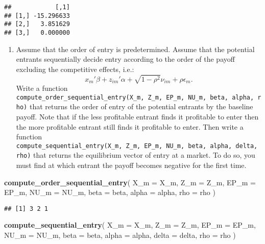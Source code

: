 \documentclass[
]{book}
\newenvironment{Shaded}{\begin{snugshade}}{\end{snugshade}}
\newcommand{\AttributeTok}[1]{\textcolor[rgb]{0.13,0.29,0.53}{#1}}
\newcommand{\FunctionTok}[1]{\textcolor[rgb]{0.13,0.29,0.53}{\textbf{#1}}}
\newcommand{\NormalTok}[1]{#1}
\providecommand{\tightlist}{%
  \setlength{\itemsep}{0pt}\setlength{\parskip}{0pt}}
\begin{document}
\begin{verbatim}
##            [,1]
## [1,] -15.296633
## [2,]   3.851629
## [3,]   0.000000
\end{verbatim}

\begin{enumerate}
\def\labelenumi{\arabic{enumi}.}
\setcounter{enumi}{4}
\tightlist
\item
  Assume that the order of entry is predetermined. Assume that the potential entrants sequentially decide entry according to the order of the payoff excluding the competitive effects, i.e.:
  \[
  x_m'\beta + z_{im}'\alpha + \sqrt{1 - \rho^2} \nu_{im} + \rho \epsilon_{m}.
  \]
  Write a function \texttt{compute\_order\_sequential\_entry(X\_m,\ Z\_m,\ EP\_m,\ NU\_m,\ beta,\ alpha,\ rho)} that returns the order of entry of the potential entrants by the baseline payoff. Note that if the less profitable entrant finds it profitable to enter then the more profitable entrant still finds it profitable to enter. Then write a function \texttt{compute\_sequential\_entry(X\_m,\ Z\_m,\ EP\_m,\ NU\_m,\ beta,\ alpha,\ delta,\ rho)} that returns the equilibrium vector of entry at a market. To do so, you must find at which entrant the payoff becomes negative for the first time.
\end{enumerate}

\begin{Shaded}
\begin{Highlighting}[]
\FunctionTok{compute\_order\_sequential\_entry}\NormalTok{(}
    \AttributeTok{X\_m =}\NormalTok{ X\_m,}
    \AttributeTok{Z\_m =}\NormalTok{ Z\_m, }
    \AttributeTok{EP\_m =}\NormalTok{ EP\_m, }
    \AttributeTok{NU\_m =}\NormalTok{ NU\_m, }
    \AttributeTok{beta =}\NormalTok{ beta, }
    \AttributeTok{alpha =}\NormalTok{ alpha, }
    \AttributeTok{rho =}\NormalTok{ rho}
\NormalTok{    )}
\end{Highlighting}
\end{Shaded}

\begin{verbatim}
## [1] 3 2 1
\end{verbatim}

\begin{Shaded}
\begin{Highlighting}[]
\FunctionTok{compute\_sequential\_entry}\NormalTok{(}
  \AttributeTok{X\_m =}\NormalTok{ X\_m, }
  \AttributeTok{Z\_m =}\NormalTok{ Z\_m, }
  \AttributeTok{EP\_m =}\NormalTok{ EP\_m, }
  \AttributeTok{NU\_m =}\NormalTok{ NU\_m, }
  \AttributeTok{beta =}\NormalTok{ beta, }
  \AttributeTok{alpha =}\NormalTok{ alpha, }
  \AttributeTok{delta =}\NormalTok{ delta, }
  \AttributeTok{rho =}\NormalTok{ rho}
\NormalTok{  )}
\end{Highlighting}
\end{Shaded}
\end{document}
